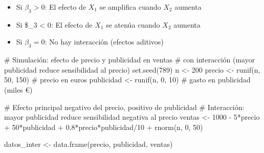 \documentclass[
  letterpaper,
  DIV=11,
  numbers=noendperiod]{scrreprt}
\newenvironment{Shaded}{\begin{snugshade}}{\end{snugshade}}
\newcommand{\CommentTok}[1]{\textcolor[rgb]{0.37,0.37,0.37}{#1}}
\newcommand{\DecValTok}[1]{\textcolor[rgb]{0.68,0.00,0.00}{#1}}
\newcommand{\FloatTok}[1]{\textcolor[rgb]{0.68,0.00,0.00}{#1}}
\newcommand{\FunctionTok}[1]{\textcolor[rgb]{0.28,0.35,0.67}{#1}}
\newcommand{\NormalTok}[1]{\textcolor[rgb]{0.00,0.23,0.31}{#1}}
\newcommand{\OtherTok}[1]{\textcolor[rgb]{0.00,0.23,0.31}{#1}}
\newcommand{\SpecialCharTok}[1]{\textcolor[rgb]{0.37,0.37,0.37}{#1}}
\providecommand{\tightlist}{%
  \setlength{\itemsep}{0pt}\setlength{\parskip}{0pt}}
\begin{document}
\begin{itemize}
\tightlist
\item
  Si \(\beta_3 > 0\): El efecto de \(X_1\) se amplifica cuando \(X_2\)
  aumenta
\item
  Si \$\beta\_3 \textless{} 0: El efecto de \(X_1\) se atenúa cuando
  \(X_2\) aumenta
\item
  Si \(\beta_3 = 0\): No hay interacción (efectos aditivos)
\end{itemize}

\begin{tcolorbox}[enhanced jigsaw, leftrule=.75mm, breakable, colbacktitle=quarto-callout-tip-color!10!white, bottomrule=.15mm, colframe=quarto-callout-tip-color-frame, toprule=.15mm, colback=white, coltitle=black, bottomtitle=1mm, left=2mm, title=\textcolor{quarto-callout-tip-color}{\faLightbulb}\hspace{0.5em}{Ejemplo: Interacción precio-publicidad en ventas}, opacityback=0, arc=.35mm, opacitybacktitle=0.6, toptitle=1mm, titlerule=0mm, rightrule=.15mm]

\begin{Shaded}
\begin{Highlighting}[]
\CommentTok{\# Simulación: efecto de precio y publicidad en ventas}
\CommentTok{\# con interacción (mayor publicidad reduce sensibilidad al precio)}
\FunctionTok{set.seed}\NormalTok{(}\DecValTok{789}\NormalTok{)}
\NormalTok{n }\OtherTok{\textless{}{-}} \DecValTok{200}
\NormalTok{precio }\OtherTok{\textless{}{-}} \FunctionTok{runif}\NormalTok{(n, }\DecValTok{50}\NormalTok{, }\DecValTok{150}\NormalTok{)  }\CommentTok{\# precio en euros}
\NormalTok{publicidad }\OtherTok{\textless{}{-}} \FunctionTok{runif}\NormalTok{(n, }\DecValTok{0}\NormalTok{, }\DecValTok{10}\NormalTok{)  }\CommentTok{\# gasto en publicidad (miles €)}

\CommentTok{\# Efecto principal negativo del precio, positivo de publicidad}
\CommentTok{\# Interacción: mayor publicidad reduce sensibilidad negativa al precio}
\NormalTok{ventas }\OtherTok{\textless{}{-}} \DecValTok{1000} \SpecialCharTok{{-}} \DecValTok{5}\SpecialCharTok{*}\NormalTok{precio }\SpecialCharTok{+} \DecValTok{50}\SpecialCharTok{*}\NormalTok{publicidad }\SpecialCharTok{+} \FloatTok{0.8}\SpecialCharTok{*}\NormalTok{precio}\SpecialCharTok{*}\NormalTok{publicidad}\SpecialCharTok{/}\DecValTok{10} \SpecialCharTok{+} 
          \FunctionTok{rnorm}\NormalTok{(n, }\DecValTok{0}\NormalTok{, }\DecValTok{50}\NormalTok{)}

\NormalTok{datos\_inter }\OtherTok{\textless{}{-}} \FunctionTok{data.frame}\NormalTok{(precio, publicidad, ventas)}


\end{Highlighting}
\end{Shaded}
\end{tcolorbox}
\end{document}
